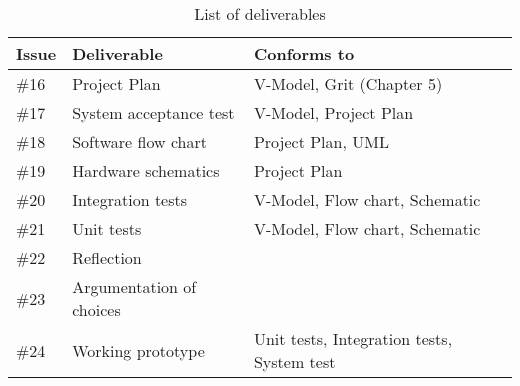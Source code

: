 \begin{table}
\centering
\begin{adjustwidth}{-1in}{1in}
\centering
\begin{tabular}{lll}
\hline Issue & Deliverable & Conforms to \\\hline
\hline
\#16 & Project Plan & V-Model\cite{vmodel}, Grit (Chapter 5)\cite{grit} \\
\#17 & System acceptance test & V-Model\cite{vmodel}, Project Plan \\
\#18 & Software flow chart & Project Plan, UML\cite{uml} \\
\#19 & Hardware schematics & Project Plan \\
\#20 & Integration tests & V-Model\cite{vmodel}, Flow chart, Schematic \\
\#21 & Unit tests & V-Model\cite{vmodel}, Flow chart, Schematic \\
\#22 & Reflection \\
\#23 & Argumentation of choices \\
\#24 & Working prototype & Unit tests, Integration tests, System test \\
\hline
\end{tabular}
\end{adjustwidth}
\caption{List of deliverables}
\label{tab:vmodeldeliverables}
\end{table}

